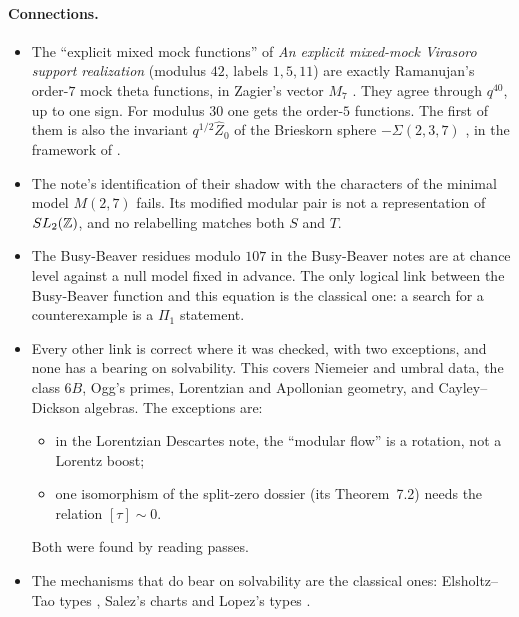 \paragraph{Connections.}
\begin{itemize}
\item The ``explicit mixed mock functions'' of \emph{An explicit mixed-mock Virasoro support realization} (modulus $42$, labels $1,5,11$) are exactly Ramanujan's order-$7$ mock theta functions, in Zagier's vector $M_7$ \cite{Zagier}. They agree through $q^{40}$, up to one sign. For modulus $30$ one gets the order-$5$ functions. The first of them is also the invariant $q^{1/2}\widehat Z_0$ of the Brieskorn sphere $-\Sigma(2,3,7)$ \cite[eq.~(3.20)]{CFS}, in the framework of \cite{CCFGH}.
\item The note's identification of their shadow with the characters of the minimal model $M(2,7)$ fails. Its modified modular pair is not a representation of $SL_2(\mathbb{Z})$, and no relabelling matches both $S$ and $T$.
\item The Busy-Beaver residues modulo $107$ in the Busy-Beaver notes are at chance level against a null model fixed in advance. The only logical link between the Busy-Beaver function and this equation is the classical one: a search for a counterexample is a $\Pi_1$ statement.
\item Every other link is correct where it was checked, with two exceptions, and none has a bearing on solvability. This covers Niemeier and umbral data, the class $6B$, Ogg's primes, Lorentzian and Apollonian geometry, and Cayley--Dickson algebras. The exceptions are:
\begin{itemize}
\item in the Lorentzian Descartes note, the ``modular flow'' is a rotation, not a Lorentz boost;
\item one isomorphism of the split-zero dossier (its Theorem~7.2) needs the relation $[\tau]\sim0$.
\end{itemize}
Both were found by reading passes.
\item The mechanisms that do bear on solvability are the classical ones: Elsholtz--Tao types \cite{ElsholtzTao}, Salez's charts \cite{Salez} and Lopez's types \cite{Lopez}.
\end{itemize}
